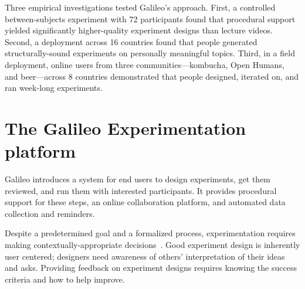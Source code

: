 Three empirical investigations tested Galileo's approach. First, a controlled between-subjects experiment with 72 participants found that procedural support yielded significantly higher-quality experiment designs than lecture videos. Second, a deployment across 16 countries found that people generated structurally-sound experiments on personally meaningful topics. Third, in a field deployment, online users from three communities---kombucha, Open Humans, and beer---across 8 countries demonstrated that people designed, iterated on, and ran week-long experiments.

\section{The Galileo Experimentation platform}

Galileo introduces a system for end users to design experiments, get them reviewed, and run them with interested participants. It provides procedural support for these steps, an online collaboration platform, and automated data collection and reminders.

Despite a predetermined goal and a formalized process, experimentation requires making contextually-appropriate decisions~\cite{Martin2007}. Good experiment design is inherently user centered; designers need awareness of others' interpretation of their ideas and asks. Providing feedback on experiment designs requires knowing the success criteria and how to help improve.

